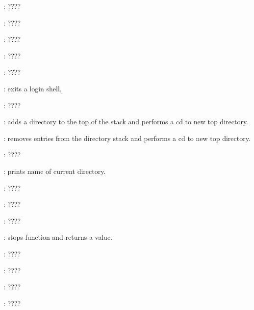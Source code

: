 \begin{compactenum}
\item [\symbolbash] : \dotfill ????

\item [\symbolbash] : \dotfill ????

\item [\symbolbash] : \dotfill ????

\item [\symbolbash] : \dotfill ????

\item [\symbolbash] : \dotfill ????

\item [\symbolbash] : exits a login shell.

\item [\symbolbash] : \dotfill ????

\item [\symbolbash] : adds a directory to the top of the stack and performs a cd to new top directory.
\item [\symbolbash] : removes entries from the directory stack and performs a cd to new top directory.

\item [\symbolbash] : \dotfill ????

\item [\symbolbash] : prints name of current directory.

\item [\symbolbash] : \dotfill ????

\item [\symbolbash] : \dotfill ????

\item [\symbolbash] : \dotfill ????

\item [\symbolbash] : stops function and returns a value.

\item [\symbolbash] : \dotfill ????

\item [\symbolbash] : \dotfill ????

\item [\symbolbash] : \dotfill ????

\item [\symbolbash] : \dotfill ????


\end{compactenum}
